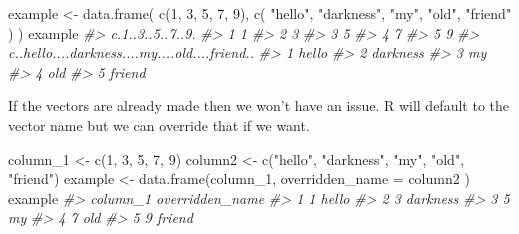 \documentclass[
]{krantz}
\makeatletter
\newenvironment{Shaded}{\begin{snugshade}}{\end{snugshade}}
\newcommand{\AttributeTok}[1]{\textcolor[rgb]{0.61,0.61,0.61}{#1}}
\newcommand{\CommentTok}[1]{\textcolor[rgb]{0.37,0.37,0.37}{\textit{#1}}}
\newcommand{\DecValTok}[1]{\textcolor[rgb]{0.06,0.06,0.06}{#1}}
\newcommand{\FunctionTok}[1]{\textcolor[rgb]{0,0,0}{#1}}
\newcommand{\NormalTok}[1]{#1}
\newcommand{\OtherTok}[1]{\textcolor[rgb]{0.37,0.37,0.37}{#1}}
\newcommand{\StringTok}[1]{\textcolor[rgb]{0.5,0.5,0.5}{#1}}
\newenvironment{kframe}{%
\medskip{}
\setlength{\fboxsep}{.8em}
 \def\at@end@of@kframe{}%
 \ifinner\ifhmode%
  \def\at@end@of@kframe{\end{minipage}}%
  \begin{minipage}{\columnwidth}%
 \fi\fi%
 \def\FrameCommand##1{\hskip\@totalleftmargin \hskip-\fboxsep
 \colorbox{shadecolor}{##1}\hskip-\fboxsep
     \hskip-\linewidth \hskip-\@totalleftmargin \hskip\columnwidth}%
 \MakeFramed {\advance\hsize-\width
   \@totalleftmargin\z@ \linewidth\hsize
   \@setminipage}}%
 {\par\unskip\endMakeFramed%
 \at@end@of@kframe}
\renewenvironment{Shaded}{\begin{kframe}}{\end{kframe}}
\makeatother
\begin{document}
\begin{Shaded}
\begin{Highlighting}[]
\NormalTok{example }\OtherTok{\textless{}{-}} \FunctionTok{data.frame}\NormalTok{(}
  \FunctionTok{c}\NormalTok{(}\DecValTok{1}\NormalTok{, }\DecValTok{3}\NormalTok{, }\DecValTok{5}\NormalTok{, }\DecValTok{7}\NormalTok{, }\DecValTok{9}\NormalTok{),}
  \FunctionTok{c}\NormalTok{(}
    \StringTok{"hello"}\NormalTok{,}
    \StringTok{"darkness"}\NormalTok{,}
    \StringTok{"my"}\NormalTok{,}
    \StringTok{"old"}\NormalTok{,}
    \StringTok{"friend"}
\NormalTok{  )}
\NormalTok{)}
\NormalTok{example}
\CommentTok{\#\textgreater{}   c.1..3..5..7..9.}
\CommentTok{\#\textgreater{} 1                1}
\CommentTok{\#\textgreater{} 2                3}
\CommentTok{\#\textgreater{} 3                5}
\CommentTok{\#\textgreater{} 4                7}
\CommentTok{\#\textgreater{} 5                9}
\CommentTok{\#\textgreater{}   c..hello....darkness....my....old....friend..}
\CommentTok{\#\textgreater{} 1                                         hello}
\CommentTok{\#\textgreater{} 2                                      darkness}
\CommentTok{\#\textgreater{} 3                                            my}
\CommentTok{\#\textgreater{} 4                                           old}
\CommentTok{\#\textgreater{} 5                                        friend}
\end{Highlighting}
\end{Shaded}

If the vectors are already made then we won't have an issue.
R will default to the vector name but we can override that
if we want.

\begin{Shaded}
\begin{Highlighting}[]
\NormalTok{column\_1 }\OtherTok{\textless{}{-}} \FunctionTok{c}\NormalTok{(}\DecValTok{1}\NormalTok{, }\DecValTok{3}\NormalTok{, }\DecValTok{5}\NormalTok{, }\DecValTok{7}\NormalTok{, }\DecValTok{9}\NormalTok{)}
\NormalTok{column2 }\OtherTok{\textless{}{-}} \FunctionTok{c}\NormalTok{(}\StringTok{"hello"}\NormalTok{, }\StringTok{"darkness"}\NormalTok{, }\StringTok{"my"}\NormalTok{, }\StringTok{"old"}\NormalTok{, }\StringTok{"friend"}\NormalTok{)}
\NormalTok{example }\OtherTok{\textless{}{-}} \FunctionTok{data.frame}\NormalTok{(column\_1,}
  \AttributeTok{overridden\_name =}\NormalTok{ column2}
\NormalTok{)}
\NormalTok{example}
\CommentTok{\#\textgreater{}   column\_1 overridden\_name}
\CommentTok{\#\textgreater{} 1        1           hello}
\CommentTok{\#\textgreater{} 2        3        darkness}
\CommentTok{\#\textgreater{} 3        5              my}
\CommentTok{\#\textgreater{} 4        7             old}
\CommentTok{\#\textgreater{} 5        9          friend}
\end{Highlighting}
\end{Shaded}
\end{document}
